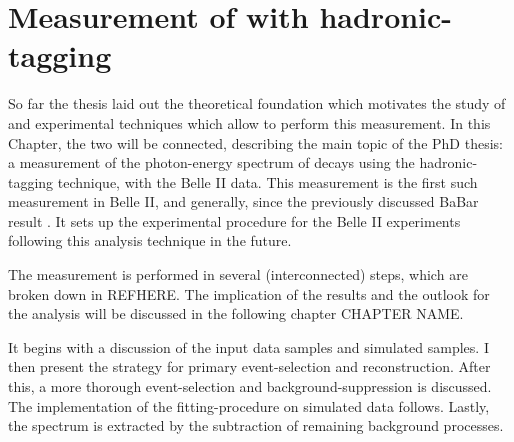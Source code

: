 \chapter{Measurement of \safeBtoXsgamma with hadronic-tagging}

So far the thesis laid out the theoretical foundation which motivates the study of \BtoXsgamma 
and experimental techniques which allow to perform this measurement.
In this Chapter, the two will be connected, describing the main topic of the PhD thesis: 
a measurement of the photon-energy spectrum of \BtoXsgamma decays using the hadronic-tagging technique,
with the Belle II data.
This measurement is the first such measurement in Belle II, and generally, since the previously discussed BaBar result \cite{BaBar:2007yhb}.
It sets up the experimental procedure for the Belle II experiments following this analysis technique in the future.

The measurement is performed in several (interconnected) steps, which are broken down in REFHERE.
The implication of the results and the outlook for the analysis will be discussed in the following chapter CHAPTER NAME.





It begins with a discussion of the input data samples and simulated samples.
I then present the strategy for primary event-selection and reconstruction.
After this, a more thorough event-selection and background-suppression is discussed.
The implementation of the fitting-procedure on simulated data follows.
Lastly, the spectrum is extracted by the subtraction of remaining background processes.